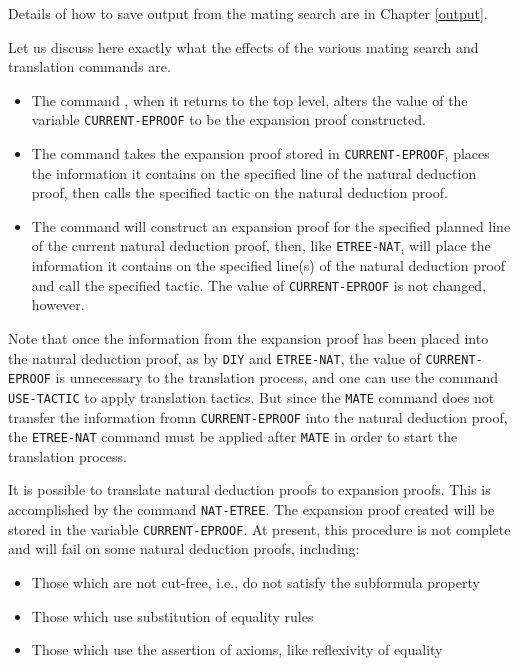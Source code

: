 Details of how to save output from the mating search are in Chapter
\ref{output}.

Let us discuss here exactly what the effects of the various mating
search and translation commands are.
\begin{itemize}
\item The command , when it returns to the top level,
alters the value of
the variable {\tt CURRENT-EPROOF} to be the expansion proof constructed.

\item The command  takes the expansion proof stored
in {\tt CURRENT-EPROOF}, places the information it contains on the specified
line of the natural deduction proof, then calls the specified tactic on the
natural deduction proof.

\item The command  will construct an expansion proof for
the specified planned line of the current natural deduction proof,
then, like {\tt ETREE-NAT}, will place the information it contains on
the specified line(s) of the natural deduction proof and call the
specified tactic.  The value of {\tt CURRENT-EPROOF} is not changed, however.
\end{itemize}

Note that once the information from the expansion proof has been
placed into the natural deduction proof, as by {\tt DIY} and
{\tt ETREE-NAT}, the value of {\tt CURRENT-EPROOF} is unnecessary to
the translation process, and one can use the command {\tt USE-TACTIC} to
apply translation tactics.
But since the {\tt MATE} command does not transfer the information fromn
{\tt CURRENT-EPROOF} into the natural deduction proof,
the {\tt ETREE-NAT} command must be applied after {\tt MATE} in
order to start the translation process.

It is possible to translate natural deduction proofs to expansion proofs.
This is accomplished by the command {\tt NAT-ETREE}.  The expansion proof
created will be stored in the variable {\tt CURRENT-EPROOF}.  At present,
this procedure
is not complete and will fail on some natural deduction proofs, including:
\begin{itemize}
\item Those which are not cut-free, i.e., do not satisfy the subformula property

\item Those which use substitution of equality rules

\item Those which use the assertion of axioms, like reflexivity of equality
\end{itemize}





